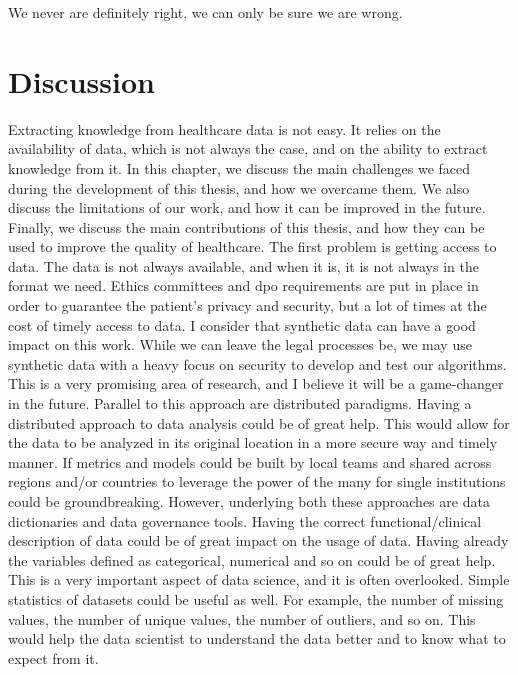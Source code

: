 \begin{savequote}[75mm]
We never are definitely right, we can only be sure we are wrong.
\end{savequote}
\chapter{Discussion} \label{chap:disc}


Extracting knowledge from healthcare data is not easy. It relies on the availability of data, which is not always the case, and on the ability to extract knowledge from it. In this chapter, we discuss the main challenges we faced during the development of this thesis, and how we overcame them. We also discuss the limitations of our work, and how it can be improved in the future. Finally, we discuss the main contributions of this thesis, and how they can be used to improve the quality of healthcare.
The first problem is getting access to data. The data is not always available, and when it is, it is not always in the format we need. Ethics committees and \ac{dpo} requirements are put in place in order to guarantee the patient's privacy and security, but a lot of times at the cost of timely access to data. I consider that synthetic data can have a good impact on this work. While we can leave the legal processes be, we may use synthetic data with a heavy focus on security to develop and test our algorithms. This is a very promising area of research, and I believe it will be a game-changer in the future.
Parallel to this approach are distributed paradigms. Having a distributed approach to data analysis could be of great help. This would allow for the data to be analyzed in its original location in a more secure way and timely manner. If metrics and models could be built by local teams and shared across regions and/or countries to leverage the power of the many for single institutions could be groundbreaking. However, underlying both these approaches are data dictionaries and data governance tools. Having the correct functional/clinical description of data could be of great impact on the usage of data. Having already the variables defined as categorical, numerical and so on could be of great help. This is a very important aspect of data science, and it is often overlooked. Simple statistics of datasets could be useful as well. For example, the number of missing values, the number of unique values, the number of outliers, and so on. This would help the data scientist to understand the data better and to know what to expect from it. 

